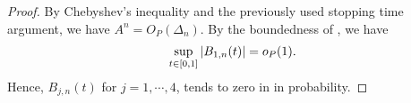 \begin{proof}
\begin{comment}
Now using the fact that $\int_0^{t \wedge T_c}\sumin D_i(s) \sigma(s) \D W_s$ is a  martingale, we may make an appeal to the Burkholder-Davis-Gundy (BDG) inequality \citep[Theorem 10.36][]{He1992} to yield:
\begin{align}
  \e(\vert A_1^{T_c} \vert) & \le c\e\left[\left\vert\int_0^{1\wedge T_c}\left(\sumin D_i(s) \sigma(s)\right)^2 \D s\right\vert^{1/2} \right]\notag \\
  & \le c\e\left[\left\vert\int_0^{1 \wedge T_c}\sumin \{D_i(s) \sigma(s)\}^2 \D s\right\vert^{1/2} \right]\notag,
  \notag
  \label{}
\end{align}
where the last line follows because $D_i (s) D_j(s) = 0$ whenever $i \not= j$. Now if  we define $D^*_i := \sup_{t_i <s \le t_{i+1} \wedge T_c} D_i(s)$, and use the fact that $\sigma^2$ is less than  $c$ before $T_c$ then
\begin{align}
  \e(\vert A_1^{T_c}\vert ) & \le c\e\left[\left\vert\sumin \Delta_n(D_i^*)^2 \right\vert^{1/2} \right] \notag\\
  & \le c\Delta_n^{1/2}\e\left[\left\vert\sumin (D_i^*)^2 \right\vert^{1/2} \right] \notag\\
  & \le c\Delta_n^{1/2}\sumin\e[D_i^*]   
  \label{eq:ra1}
\end{align}
where $c$ is a generic constant representing the bound on $\sigma^2$ and the BDG constant.  Note  from the definition of  $D_i$  that it  is itself a martingale, so we may bound  $D^*_i$  with yet another application of the BDG inequality. That is
\begin{align}
  \e((D^*_i)^2) &\le \e\left(\int^{t_{i+1} \wedge T_c}_{t_i} \sigma^2(s) \D s\right) \notag\\
  &\le c \Delta_n. 
  \label{}
\end{align}
Hence, given any $\varepsilon > 0$,  $\p( \sup_{t \in [0,1]} \vert B_{1,n}(t) \vert > \varepsilon)  = O(H_n n^{-1}) + \p(T_c < 1)$.
\end{comment}
By Chebyshev's inequality and the previously used stopping time argument, we have
$A^n = O_P(\Delta_n)$. By the boundedness of \ghk, we have
\begin{align}
  \sup_{t \in [0,1]} \vert B_{1,n}(t)\vert = o_P(1).\notag
  \label{}
\end{align}
Hence, $B_{j,n}(t)$ for $j =1,\cdots,4$, tends to zero in \Ltwo in probability.
\end{proof}
